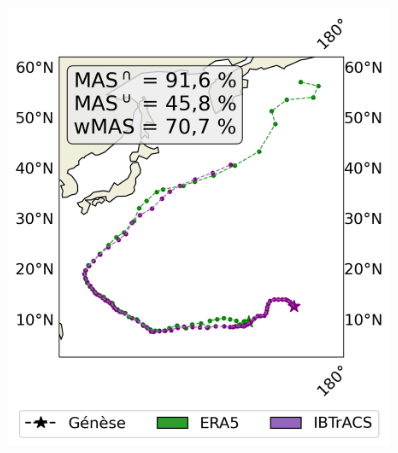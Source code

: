 \documentclass[aspectratio=169, usepdftitle=false, xcolor={dvipsnames}, 9pt,table]{beamer}
\begin{document}
\begin{frame}[t]
\begin{columns}[t]
\begin{column}{0.33\textwidth}
{\begin{figure}
                    \includegraphics[width=0.9\textwidth]{Figures/exemple_similarity.png}
                \end{figure}
            }
        \end{column}
    \end{columns}
\end{frame}
\end{document}

